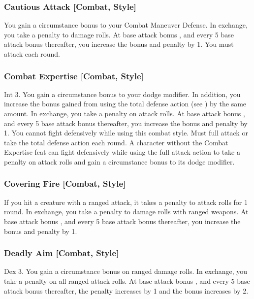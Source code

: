\subsubsection{Cautious Attack [Combat, Style]}
 You gain a  circumstance bonus to your Combat Maneuver Defense. In exchange, you take a  penalty to damage rolls. At base attack bonus , and every 5 base attack bonus thereafter, you increase the bonus and penalty by 1.
 You must attack each round.

\subsubsection{Combat Expertise [Combat, Style]}
 Int 3.
 You gain a  circumstance bonus to your dodge modifier. In addition, you increase the bonus gained from using the total defense action (see ) by the same amount. In exchange, you take a  penalty on attack rolls. At base attack bonus , and every 5 base attack bonus thereafter, you increase the bonus and penalty by 1. You cannot fight defensively while using this combat style.
 Must full attack or take the total defense action each round.
 A character without the Combat Expertise feat can fight defensively while using the full attack action to take a  penalty on attack rolls and gain a  circumstance bonus to its dodge modifier.

\subsubsection{Covering Fire [Combat, Style]}
 If you hit a creature with a ranged attack, it takes a  penalty to attack rolls for 1 round. In exchange, you take a  penalty to damage rolls with ranged weapons. At base attack bonus , and every 5 base attack bonus thereafter, you increase the bonus and penalty by 1.

\subsubsection{Deadly Aim [Combat, Style]}
 Dex 3.
 You gain a  circumstance bonus on ranged damage rolls. In exchange, you take a  penalty on all ranged attack rolls. At base attack bonus , and every 5 base attack bonus thereafter, the penalty increases by 1 and the bonus increases by 2.

